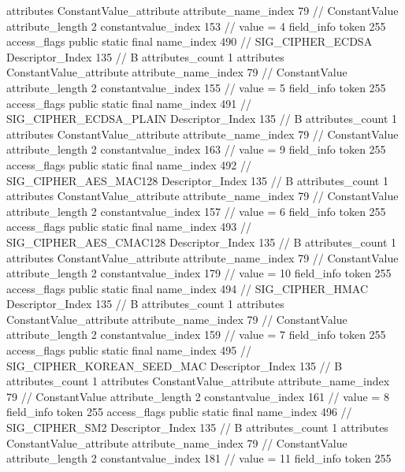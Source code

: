{{{{{				attributes {
				ConstantValue_attribute {
					attribute_name_index	79		// ConstantValue
					attribute_length	2
					constantvalue_index	153		// value = 4
				}
				}
			}
			field_info {
				token	255
				access_flags	public static final
				name_index	490		// SIG_CIPHER_ECDSA
				Descriptor_Index	135		// B
				attributes_count	1
				attributes {
				ConstantValue_attribute {
					attribute_name_index	79		// ConstantValue
					attribute_length	2
					constantvalue_index	155		// value = 5
				}
				}
			}
			field_info {
				token	255
				access_flags	public static final
				name_index	491		// SIG_CIPHER_ECDSA_PLAIN
				Descriptor_Index	135		// B
				attributes_count	1
				attributes {
				ConstantValue_attribute {
					attribute_name_index	79		// ConstantValue
					attribute_length	2
					constantvalue_index	163		// value = 9
				}
				}
			}
			field_info {
				token	255
				access_flags	public static final
				name_index	492		// SIG_CIPHER_AES_MAC128
				Descriptor_Index	135		// B
				attributes_count	1
				attributes {
				ConstantValue_attribute {
					attribute_name_index	79		// ConstantValue
					attribute_length	2
					constantvalue_index	157		// value = 6
				}
				}
			}
			field_info {
				token	255
				access_flags	public static final
				name_index	493		// SIG_CIPHER_AES_CMAC128
				Descriptor_Index	135		// B
				attributes_count	1
				attributes {
				ConstantValue_attribute {
					attribute_name_index	79		// ConstantValue
					attribute_length	2
					constantvalue_index	179		// value = 10
				}
				}
			}
			field_info {
				token	255
				access_flags	public static final
				name_index	494		// SIG_CIPHER_HMAC
				Descriptor_Index	135		// B
				attributes_count	1
				attributes {
				ConstantValue_attribute {
					attribute_name_index	79		// ConstantValue
					attribute_length	2
					constantvalue_index	159		// value = 7
				}
				}
			}
			field_info {
				token	255
				access_flags	public static final
				name_index	495		// SIG_CIPHER_KOREAN_SEED_MAC
				Descriptor_Index	135		// B
				attributes_count	1
				attributes {
				ConstantValue_attribute {
					attribute_name_index	79		// ConstantValue
					attribute_length	2
					constantvalue_index	161		// value = 8
				}
				}
			}
			field_info {
				token	255
				access_flags	public static final
				name_index	496		// SIG_CIPHER_SM2
				Descriptor_Index	135		// B
				attributes_count	1
				attributes {
				ConstantValue_attribute {
					attribute_name_index	79		// ConstantValue
					attribute_length	2
					constantvalue_index	181		// value = 11
				}
				}
			}
			field_info {
				token	255
}}}}}
